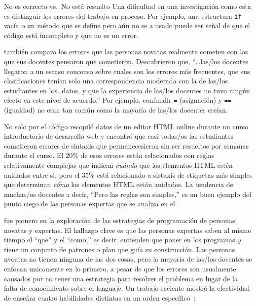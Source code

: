 \begin{aside}{No es correcto vs.\ No está resuelto}
  Una dificultad en una investigación como esta es distinguir los errores del trabajo en proceso.
  Por ejemplo,
  una estructura \texttt{if} vacía o un método que se define pero aún no se a usado
  puede ser señal de que el código está incompleto y que no es un error.
\end{aside}

\cite{Brow2017} también compara los errores que las personas novatas realmente cometen 
con los que sus docentes pensaron que cometieron.
Descubrieron que,
``{\ldots}las/los docentes llegaron a un escaso concenso sobre cuales son los errores más frecuentes,
que sus clasificaciones tenían solo una correspondencia moderada con la de las/los estudiantes en los{\ldots}datos,
y que la experiencia de las/los docentes no tuvo ningún efecto en este nivel de acuerdo.''
Por ejemplo,
confundir \texttt{=} (asignación) y \texttt{==} (igualdad)
no eran tan común como la mayoría de las/los docentes creían.

\begin{aside}{No solo por el código}
  \cite{Park2015} recopiló datos de un editor HTML online durante un curso introductorio de desarrollo web
  y encontró que casi todas/os las estudiantes cometieron errores de sintaxis que permanecesieron sin ser resueltos por semanas durante el curso.
  El 20\% de esos errores están relacionados con reglas relativamente complejas
  que indican \emph{cuándo} que los elementos HTML estén anidados entre si,
  pero el 35\% está relacionado a sistaxis de etiquetas más simples que determinan \emph{cómo} los elementos HTML están anidados.
  La tendencia de muchas/os docentes a decir,
  ``Pero las reglas son simples,''
  es un buen ejemplo del punto ciego de las personas expertas que se analiza en el 
\end{aside}


\cite{Solo1984,Solo1986} fue pionero en la exploración de las estrategias de programación de personas novatas y expertas.
El hallazgo clave es que las personas expertas saben al mismo tiempo el ``que'' y el ``como,''
es decir, entienden que poner en los programas
\emph{y} tiene un conjunto de patrones o plan que guía su construcción.
Las personas nvoatas no tienen ninguna de las dos cosas,
pero la mayoría de las/los docentes se enfocan unicamente en lo primero,
a pesar de que los errores son usualmente causados por no tener una estrategia para resolver el problema
en lugar de la falta de conocimiento sobre el lenguaje.
Un trabajo reciente mostró la efectividad de enseñar cuatro habilidades distintas en un orden específico~\cite{Xie2019}:

